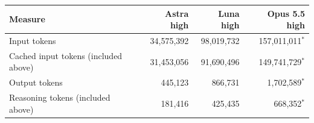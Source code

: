 \begin{tabular}{@{}lrrr@{}}
\toprule
Measure & Astra high & Luna high & Opus 5.5 high \\
\midrule
Input tokens & 34{,}575{,}392 & 98{,}019{,}732 & 157{,}011{,}011$^{*}$ \\
Cached input tokens (included above) & 31{,}453{,}056 & 91{,}690{,}496 & 149{,}741{,}729$^{*}$ \\
Output tokens & 445{,}123 & 866{,}731 & 1{,}702{,}589$^{*}$ \\
Reasoning tokens (included above) & 181{,}416 & 425{,}435 & 668{,}352$^{*}$ \\
\bottomrule
\end{tabular}
